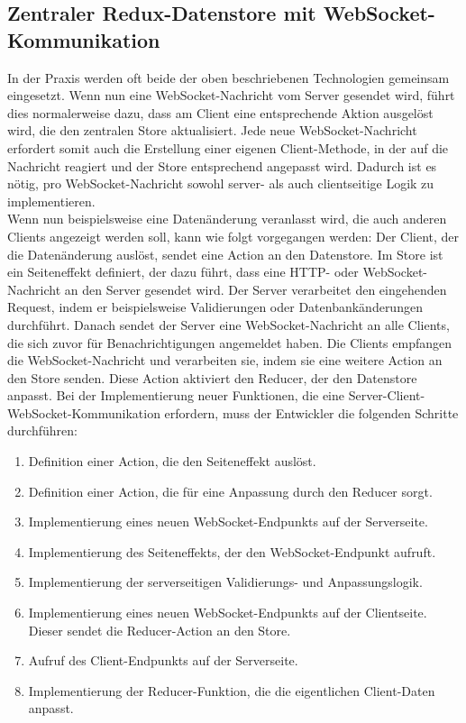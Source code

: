 \documentclass[12pt]{article} %
\begin{document}
\subsection{Zentraler Redux-Datenstore mit WebSocket-Kommunikation}
\label{simple-model}

In der Praxis werden oft beide der oben beschriebenen Technologien gemeinsam eingesetzt. Wenn nun eine WebSocket-Nachricht vom Server gesendet wird, führt dies normalerweise dazu, dass am Client eine entsprechende Aktion ausgelöst wird, die den zentralen Store aktualisiert. Jede neue WebSocket-Nachricht erfordert somit auch die Erstellung einer eigenen Client-Methode, in der auf die Nachricht reagiert und der Store entsprechend angepasst wird. Dadurch ist es nötig, pro WebSocket-Nachricht sowohl server- als auch clientseitige Logik zu implementieren.
\\

Wenn nun beispielsweise eine Datenänderung veranlasst wird, die auch anderen Clients angezeigt werden soll, kann wie folgt vorgegangen werden: Der Client, der die Datenänderung auslöst, sendet eine Action an den Datenstore. Im Store ist ein Seiteneffekt definiert, der dazu führt, dass eine HTTP- oder WebSocket-Nachricht an den Server gesendet wird. Der Server verarbeitet den eingehenden Request, indem er beispielsweise Validierungen oder Datenbankänderungen durchführt. Danach sendet der Server eine WebSocket-Nachricht an alle Clients, die sich zuvor für Benachrichtigungen angemeldet haben. Die Clients empfangen die WebSocket-Nachricht und verarbeiten sie, indem sie eine weitere Action an den Store senden. Diese Action aktiviert den Reducer, der den Datenstore anpasst. Bei der Implementierung neuer Funktionen, die eine Server-Client-WebSocket-Kommunikation erfordern, muss der Entwickler die folgenden Schritte durchführen:
\begin{enumerate}
    \item Definition einer Action, die den Seiteneffekt auslöst.
    \item Definition einer Action, die für eine Anpassung durch den Reducer sorgt.
    \item Implementierung eines neuen WebSocket-Endpunkts auf der Serverseite.
    \item Implementierung des Seiteneffekts, der den WebSocket-Endpunkt aufruft.
    \item Implementierung der serverseitigen Validierungs- und Anpassungslogik.
    \item Implementierung eines neuen WebSocket-Endpunkts auf der Clientseite. Dieser sendet die Reducer-Action an den Store.
    \item Aufruf des Client-Endpunkts auf der Serverseite.
    \item Implementierung der Reducer-Funktion, die die eigentlichen Client-Daten anpasst.
\end{enumerate}
\end{document}

